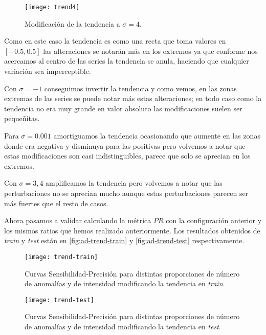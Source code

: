 \begin{figure}[htpb]
  \centering
  \texttt{[image: trend4]}
  \caption{Modificación de la tendencia a $\sigma = 4$.}
  \label{fig:ad-trend4}
\end{figure}

Como en este caso la tendencia es como una recta que toma valores en $[-0.5, 0.5]$ las alteraciones se notarán más en los extremos ya que conforme nos acercamos al centro de las series la tendencia se anula, haciendo que cualquier variación sea imperceptible.

Con $\sigma = -1$ conseguimos invertir la tendencia y como vemos, en las zonas extremas de las series se puede notar más estas alteraciones; en todo caso como la tendencia no era muy grande en valor absoluto las modificaciones suelen ser pequeñitas.

Para $\sigma = 0.001$ amortiguamos la tendencia ocasionando que aumente en las zonas donde era negativa y disminuya para las positivas pero volvemos a notar que estas modificaciones son casi indistinguibles, parece que solo se aprecian en los extremos.

Con $\sigma = 3, 4$ amplificamos la tendencia pero volvemos a notar que las perturbaciones no se aprecian mucho aunque estas perturbaciones parecen ser más fuertes que el resto de casos.

Ahora pasamos a validar calculando la métrica $PR$ con la configuración anterior y los mismos ratios que hemos realizado anteriormente. Los resultados obtenidos de \emph{train} y \emph{test} están en \autoref{fig:ad-trend-train} y \autoref{fig:ad-trend-test} respectivamente.

\begin{figure}[htpb]
  \centering
  \texttt{[image: trend-train]}
  \caption{Curvas Sensibilidad-Precisión para distintas proporciones de número de anomalías y de intensidad modificando la tendencia en \emph{train}.}
  \label{fig:ad-trend-train}
\end{figure}

\begin{figure}[htpb]
  \centering
  \texttt{[image: trend-test]}
  \caption{Curvas Sensibilidad-Precisión para distintas proporciones de número de anomalías y de intensidad modificando la tendencia en \emph{test}.}
  \label{fig:ad-trend-test}
\end{figure}

